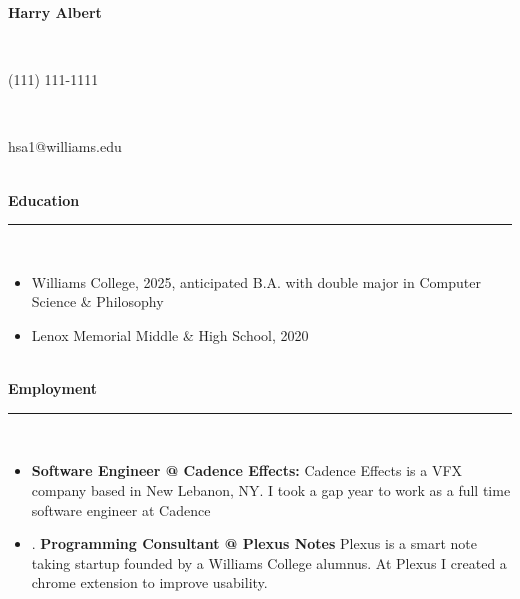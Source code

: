 \documentclass[10pt]{extarticle}
\begin{document}
\thispagestyle{empty}
\vspace{-\baselineskip}
\begin{center}
\Large \textbf{Harry Albert}
\end{center}
\vspace{-6.5ex}~\\ 
\vspace{-\baselineskip}
\begin{center}
\normalsize (111) 111-1111
\end{center}
\vspace{-6ex}~\\ 
\vspace{-\baselineskip}
\begin{center}
\normalsize hsa1@williams.edu
\end{center}
\vspace{-6ex}~\\ 
\textbf{Education}\\[-2ex]
\rule{\textwidth}{0.4pt}\\ 
\vspace{-\baselineskip}
\begin{itemize}[itemsep=0pt, topsep=0pt]
\item Williams College, 2025, anticipated B.A. with double major in Computer Science \& Philosophy
\item Lenox Memorial Middle \& High School, 2020
\end{itemize}~\\[-1ex]
\textbf{Employment}\\[-2ex]
\rule{\textwidth}{0.4pt}\\ 
\vspace{-\baselineskip}
\begin{itemize}[itemsep=0pt, topsep=0pt]
\item \textbf{Software Engineer @ Cadence Effects: } Cadence Effects is a VFX company based in New Lebanon, NY. I took a gap year to work as a full time software engineer at Cadence
\item . \textbf{Programming Consultant @ Plexus Notes} Plexus is a smart note taking startup founded by a Williams College alumnus. At Plexus I created a chrome extension to improve usability.
\end{itemize}
\end{document}
